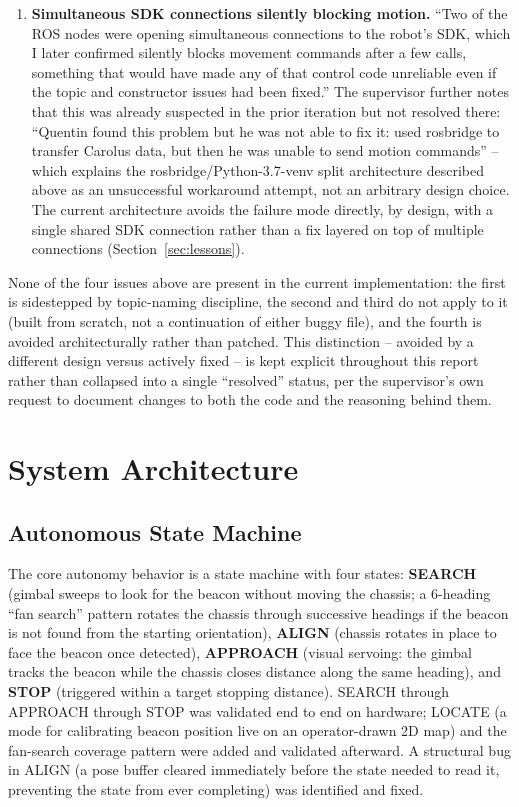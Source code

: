 \documentclass[11pt]{article}
\begin{document}
\begin{enumerate}
  \item \textbf{Simultaneous SDK connections silently blocking motion.}
  ``Two of the ROS nodes were opening simultaneous connections to the
  robot's SDK, which I later confirmed silently blocks movement commands
  after a few calls, something that would have made any of that control
  code unreliable even if the topic and constructor issues had been
  fixed.'' The supervisor further notes that this was already suspected in
  the prior iteration but not resolved there: ``Quentin found this problem
  but he was not able to fix it: used rosbridge to transfer Carolus data,
  but then he was unable to send motion commands'' -- which explains the
  rosbridge/Python-3.7-venv split architecture described above as an
  unsuccessful workaround attempt, not an arbitrary design choice. The
  current architecture avoids the failure mode directly, by design, with a
  single shared SDK connection rather than a fix layered on top of multiple
  connections (Section~\ref{sec:lessons}).
\end{enumerate}

None of the four issues above are present in the current implementation:
the first is sidestepped by topic-naming discipline, the second and third
do not apply to it (built from scratch, not a continuation of either
buggy file), and the fourth is avoided architecturally rather than patched.
This distinction -- avoided by a different design versus actively
fixed -- is kept explicit throughout this report rather than collapsed into
a single ``resolved'' status, per the supervisor's own request to document
changes to both the code and the reasoning behind them.

\section{System Architecture}

\subsection{Autonomous State Machine}
The core autonomy behavior is a state machine with four states:
\textbf{SEARCH} (gimbal sweeps to look for the beacon without moving the
chassis; a 6-heading ``fan search'' pattern rotates the chassis through
successive headings if the beacon is not found from the starting
orientation), \textbf{ALIGN} (chassis rotates in place to face the beacon
once detected), \textbf{APPROACH} (visual servoing: the gimbal tracks the
beacon while the chassis closes distance along the same heading), and
\textbf{STOP} (triggered within a target stopping distance). SEARCH through
APPROACH through STOP was validated end to end on hardware; LOCATE (a mode
for calibrating beacon position live on an operator-drawn 2D map) and the
fan-search coverage pattern were added and validated afterward. A structural
bug in ALIGN (a pose buffer cleared immediately before the state needed to
read it, preventing the state from ever completing) was identified and
fixed.
\end{document}
